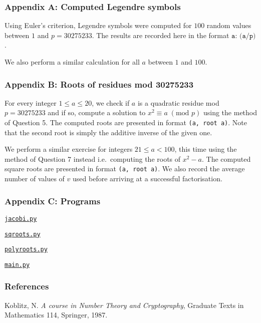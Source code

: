 \documentclass[12pt]{article}
\newcommand{\textmod}[1]{\;(\text{mod }#1)}
\begin{document}
\subsubsection*{Appendix A: Computed Legendre symbols}
Using Euler's criterion, Legendre symbols were computed for \(100\) random
values between \(1\) and \(p=30275233\). The results are recorded here in the
format \(\texttt{a: (a/p)}\).

 

We also perform a similar calculation for all \(a\) between \(1\) and \(100\).

 

\subsubsection*{Appendix B: Roots of residues mod 30275233}
For every integer \(1\leq a\leq 20\), we check if \(a\) is a quadratic residue
mod \(p=30275233\) and if so, compute a solution to \(x^2\equiv a\textmod{p}\)
using the method of Question 5.
The computed roots are presented in format \texttt{(a, root a)}. Note that the second root is simply the additive inverse of the given one.

 

We perform a similar exercise for integers \(21 \leq a < 100\), this time
using the method of Question 7 instead i.e.\ computing the roots of \(x^2-a\). 
The computed square roots are presented in format \texttt{(a, root a)}. We also
record the average number of values of \(v\) used before arriving at a
successful factorisation.

 

\pagebreak

\subsubsection*{Appendix C: Programs}

\underline{\texttt{jacobi.py}}


\underline{\texttt{sqroots.py}}


\underline{\texttt{polyroots.py}}


\underline{\texttt{main.py}}



\subsubsection*{References}
\begin{enumerate}[{[}1{]}]
    \item Koblitz, N. \textit{A course in Number Theory and Cryptography},
        Graduate Texts in Mathematics 114, Springer, 1987.
\end{enumerate}
\end{document}
